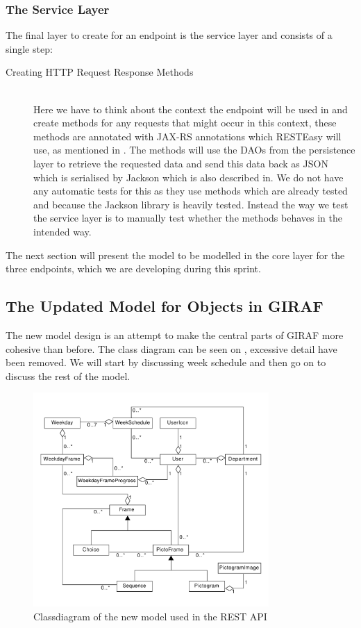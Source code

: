 \subsubsection{The Service Layer}
The final layer to create for an endpoint is the service layer and consists of a single step:
\begin{description}
	\item[Creating HTTP Request Response Methods]\hfill \\
	Here we have to think about the context the endpoint will be used in and create methods for any requests that might occur in this context, these methods are annotated with JAX-RS annotations which RESTEasy will use, as mentioned in .
	The methods will use the DAOs from the persistence layer to retrieve the requested data and send this data back as JSON which is serialised by Jackson which is also described in.
	We do not have any automatic tests for this as they use methods which are already tested and because the Jackson library is heavily tested.
	Instead the way we test the service layer is to manually test whether the methods behaves in the intended way.
\end{description}
\noindent
The next section will present the model to be modelled in the core layer for the three endpoints, which we are developing during this sprint.

\subsection{The Updated Model for Objects in GIRAF}\label{subsec:model}
The new model design is an attempt to make the central parts of GIRAF more cohesive than before.
The class diagram can be seen on , excessive detail have been removed.
We will start by discussing week schedule and then go on to discuss the rest of the model.

\begin{figure}[h]
    \centering
    \includegraphics[width=0.8\textwidth]{figures/fullclassdiagram.pdf}
    \caption{Classdiagram of the new model used in the REST API}\label{fig:fullmodelclassdiagram}
\end{figure}

